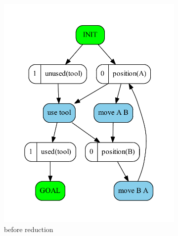 	\begin{figure}
		\begin{subfigure}[b]{0.4\textwidth}
			\includegraphics[scale=0.4]{mergingValues/figures/simple_input}
			\caption{before reduction}
		\end{subfigure}	
		\begin{subfigure}[b]{0.4\textwidth}

\end{subfigure}
\end{figure}
